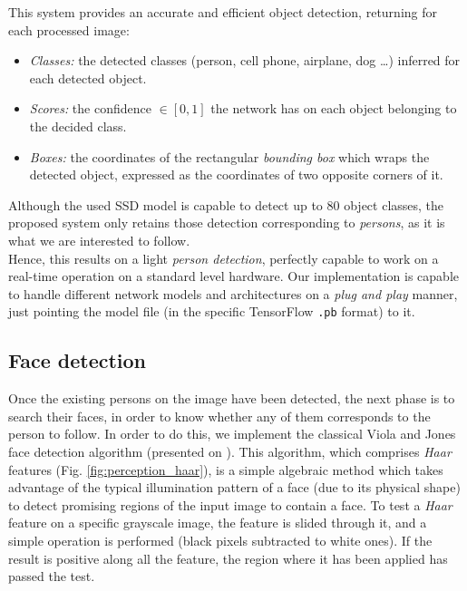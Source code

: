 This system provides an accurate and efficient object detection, returning for each processed image:

\begin{itemize}
	\item \emph{Classes:} the detected classes (person, cell phone, airplane, dog \dots) inferred for each detected object.
	
	\item \emph{Scores:} the confidence $\in [0,1]$ the network has on each object belonging to the decided class.
	
	\item \emph{Boxes:} the coordinates of the rectangular \emph{bounding box} which wraps the detected object, expressed as the coordinates of two opposite corners of it.
\end{itemize}

Although the used SSD model is capable to detect up to 80 object classes, the proposed system only retains those detection corresponding to \emph{persons}, as it is what we are interested to follow.\\


Hence, this results on a light \emph{person detection}, perfectly capable to work on a real-time operation on a standard level hardware. Our implementation is capable to handle different network models and architectures on a \emph{plug and play} manner, just pointing the model file (in the specific TensorFlow \texttt{.pb} format) to it.



\subsection{Face detection}

Once the existing persons on the image have been detected, the next phase is to search their faces, in order to know whether any of them corresponds to the person to follow. In order to do this, we implement the classical Viola and Jones face detection algorithm (presented on \cite{viola-jones}). This algorithm, which comprises \emph{Haar} features (Fig. \ref{fig:perception_haar}), is a simple algebraic method which takes advantage of the typical illumination pattern of a face (due to its physical shape) to detect promising regions of the input image to contain a face. To test a \emph{Haar} feature on a specific grayscale image, the feature is slided through it, and a simple operation is performed (black pixels subtracted to white ones). If the result is positive along all the feature, the region where it has been applied has passed the test.\\

